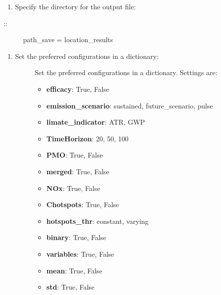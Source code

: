 \documentclass[a4paper,11pt,english]{sphinxmanual}
\begin{document}
\begin{sphinxVerbatim}[commandchars=\\\{\}]
     
\end{sphinxVerbatim}
\begin{enumerate}
%
\setcounter{enumi}{2}
\item {} 
Specify the directory for the output file:

\end{enumerate}
\begin{description}
\item[{::}] \leavevmode
path\_save = location\_results

\end{description}
\begin{enumerate}
%
\setcounter{enumi}{3}
\item {} \begin{description}
\item[{Set the preferred configurations in a dictionary:}] \leavevmode
Set the preferred configurations in a dictionary. Settings are:
\begin{itemize}
	\item  \textbf{efficacy}: True, False
	\item \textbf{emission\_scenario}: sustained, future\_scenario, pulse 
	\item \textbf{limate\_indicator}: ATR, GWP 
	\item \textbf{TimeHorizon}: 20, 50, 100 
	\item \textbf{PMO}: True, False 
	\item \textbf{merged}: True, False 
	\item \textbf{NOx}: True, False 
	\item \textbf{Chotspots}: True, False 
	\item \textbf{hotspots\_thr}: constant, varying 
	\item \textbf{binary}: True, False 
	\item \textbf{variables}: True, False 
	\item \textbf{mean}: True, False 
	\item \textbf{std}: True, False 
\end{itemize}



\end{description}

\end{enumerate}
\end{document}
